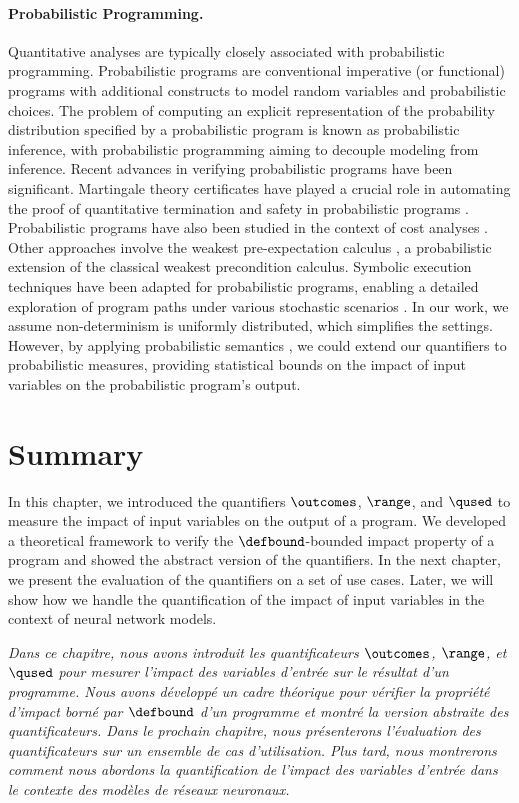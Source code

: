 \paragraph{Probabilistic Programming.} 
Quantitative analyses are typically closely associated with probabilistic programming.
Probabilistic programs  are conventional imperative (or functional) programs with additional constructs to model random variables and probabilistic choices.
The problem of computing an explicit representation of the probability distribution specified by a probabilistic program is known as probabilistic inference, with probabilistic programming aiming to decouple modeling from inference.
Recent advances in verifying probabilistic programs have been significant.
Martingale theory certificates have played a crucial role in automating the proof of quantitative termination and safety in probabilistic programs .
Probabilistic programs have also been studied in the context of cost analyses .
Other approaches involve the weakest pre-expectation calculus , a probabilistic extension of the classical weakest precondition calculus.
Symbolic execution techniques have been adapted for probabilistic programs, enabling a detailed exploration of program paths under various stochastic scenarios .
In our work, we assume non-determinism is uniformly distributed, which simplifies the settings.
However, by applying probabilistic semantics , we could extend our quantifiers to probabilistic measures, providing statistical bounds on the impact of input variables on the probabilistic program's output.


\section{Summary}

In this chapter, we introduced the quantifiers $\outcomes$, $\range$, and $\qused$ to measure the impact of input variables on the output of a program.
We developed a theoretical framework to verify the $\defbound$-bounded impact property of a program and showed the abstract version of the quantifiers.
In the next chapter, we present the evaluation of the quantifiers on a set of use cases.
Later, we will show how we handle the quantification of the impact of input variables in the context of neural network models.


\frenchdiv

\emph{Dans ce chapitre, nous avons introduit les quantificateurs $\outcomes$, $\range$, et $\qused$ pour mesurer l'impact des variables d'entrée sur le résultat d'un programme. Nous avons développé un cadre théorique pour vérifier la propriété d'impact borné par $\defbound$ d'un programme et montré la version abstraite des quantificateurs. Dans le prochain chapitre, nous présenterons l'évaluation des quantificateurs sur un ensemble de cas d'utilisation. Plus tard, nous montrerons comment nous abordons la quantification de l'impact des variables d'entrée dans le contexte des modèles de réseaux neuronaux.}
